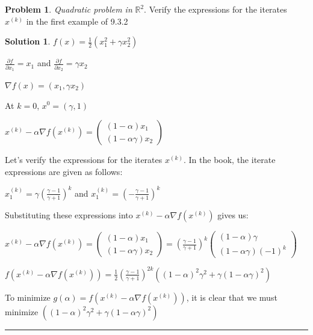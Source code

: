 \documentclass{article}
\theoremstyle{definition}
\newtheorem{problem}{Problem}
\def\fline{\rule{0.75\linewidth}{0.5pt}}
\newcommand{\finishline}{\begin{center}\fline\end{center}}
\newtheorem*{solution*}{Solution}
\newenvironment{solution}{\begin{solution*}}{{\finishline} \end{solution*}}
\begin{document}
\begin{problem} \textit{Quadratic problem in } $\mathbb{R}^2.$  Verify the expressions for the iterates $x^{(k)}$ in the first example of 9.3.2

\begin{solution} 
$f(x) = \frac{1}{2} (x_1^2 + \gamma x_2^2)$\newline 

$\frac{\partial{f}}{\partial{x_1}} = x_1$ and $\frac{\partial{f}}{\partial{x_2}} = \gamma x_2$ \newline 

$\nabla f(x) = (x_1, \gamma x_2)$ \newline 

At $k = 0$, $x^0 = (\gamma, 1)$ \newline 


$x^{(k)} - \alpha \nabla f(x^{(k)}) = \begin{pmatrix}
(1 - \alpha) x_1 \\
(1 - \alpha \gamma) x_2
\end{pmatrix}$

Let's verify the expressions for the iterates $x^{(k)}$. In the book, the iterate expressions are given as follows: \newline 

$x_1^{(k)} = \gamma (\frac{\gamma - 1}{\gamma + 1})^k$ and $x_1^{(k)} = (-\frac{\gamma - 1}{\gamma + 1})^k$

Substituting these expressions into $x^{(k)} - \alpha \nabla f(x^{(k)})$ gives us: \newline 

$x^{(k)} - \alpha \nabla f(x^{(k)}) = \begin{pmatrix}
(1 - \alpha) x_1 \\
(1 - \alpha \gamma) x_2
\end{pmatrix} = (\frac{\gamma - 1}{\gamma + 1})^k \begin{pmatrix}
(1 - \alpha) \gamma \\
(1 - \alpha \gamma) (-1)^k
\end{pmatrix}$ \newline 

$f(x^{(k)} - \alpha \nabla f(x^{(k)})) = \frac{1}{2} (\frac{\gamma - 1}{\gamma + 1})^{2k} ((1 - \alpha)^2 \gamma^2 + \gamma (1 - \alpha \gamma)^2)$ \newline 

To minimize $g(\alpha) = f(x^{(k)} - \alpha \nabla f(x^{(k)}))$, it is clear that we must minimize $((1 - \alpha)^2 \gamma^2 + \gamma (1 - \alpha \gamma)^2)$


\end{solution}
\end{problem}
\end{document}
